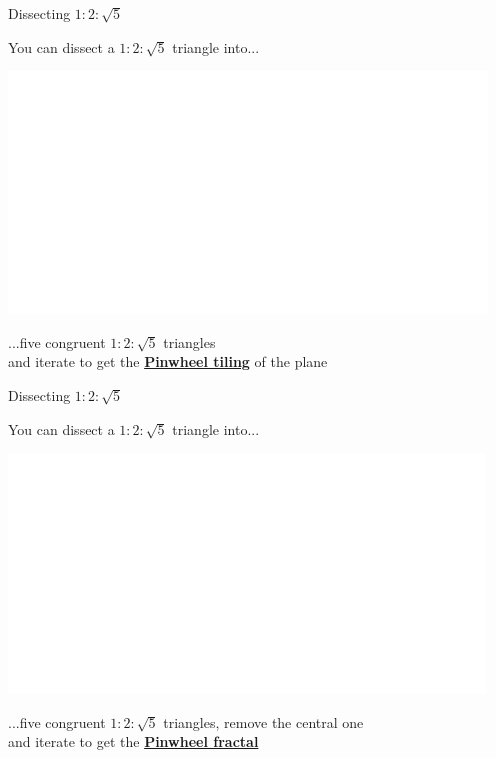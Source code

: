 \documentclass[14pt]{beamer}
\begin{document}
    \begin{frame}{Dissecting $1\!\!:\!\!2\!\!:\!\!\sqrt{5}$}
        \begin{center}
            You can dissect a $1\!\!:\!\!2\!\!:\!\!\sqrt{5}$ triangle into...

            \bigskip \bigskip

            \includegraphics[height=18ex]{figures/figure006g.pdf}

            \bigskip \bigskip

            ...five congruent $1\!\!:\!\!2\!\!:\!\!\sqrt{5}$ triangles\\and iterate to get the \textbf{\href{https://en.wikipedia.org/wiki/Pinwheel_tiling}{Pinwheel tiling}} of the plane
        \end{center}
    \end{frame}


    \begin{frame}{Dissecting $1\!\!:\!\!2\!\!:\!\!\sqrt{5}$}
        \begin{center}
            You can dissect a $1\!\!:\!\!2\!\!:\!\!\sqrt{5}$ triangle into...

            \bigskip \bigskip

            \includegraphics[height=18ex]{figures/figure006h.pdf}

            \bigskip \bigskip

            ...five congruent $1\!\!:\!\!2\!\!:\!\!\sqrt{5}$ triangles, remove the central one\\and iterate to get the \textbf{\href{https://en.wikipedia.org/wiki/Pinwheel_tiling}{Pinwheel fractal}}
        \end{center}
    \end{frame}
\end{document}
